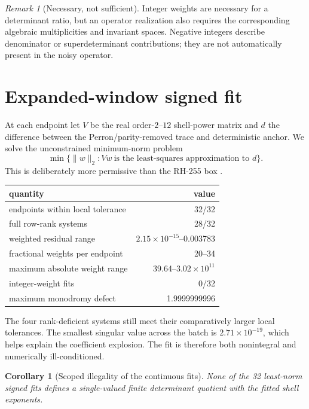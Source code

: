 \documentclass[11pt]{article}
\newtheorem{corollary}[theorem]{Corollary}
\theoremstyle{remark}
\newtheorem{remark}[theorem]{Remark}
\begin{document}
\begin{remark}[Necessary, not sufficient]
Integer weights are necessary for a determinant ratio, but an operator
realization also requires the corresponding algebraic multiplicities and
invariant spaces.  Negative integers describe denominator or superdeterminant
contributions; they are not automatically present in the noisy operator.
\end{remark}

\section{Expanded-window signed fit}

At each endpoint let $V$ be the real order-$2$--$12$ shell-power matrix and
$d$ the difference between the Perron/parity-removed trace and deterministic
anchor.  We solve the unconstrained minimum-norm problem
\begin{equation}
 \min\{\|w\|_2:Vw\ \text{is the least-squares approximation to }d\}.
 \label{eq:lstsq}
\end{equation}
This is deliberately more permissive than the RH-255 box
\citep{WangRH255}.

\begin{center}
\small
\begin{tabular}{lr}
\toprule
quantity & value\\
\midrule
endpoints within local tolerance & 32/32\\
full row-rank systems & 28/32\\
weighted residual range & $2.15\times10^{-15}$--0.003783\\
fractional weights per endpoint & 20--34\\
maximum absolute weight range & 39.64--$3.02\times10^{11}$\\
integer-weight fits & 0/32\\
maximum monodromy defect & 1.9999999996\\
\bottomrule
\end{tabular}
\end{center}

The four rank-deficient systems still meet their comparatively larger local
tolerances.  The smallest singular value across the batch is
$2.71\times10^{-19}$, which helps explain the coefficient explosion.  The
fit is therefore both nonintegral and numerically ill-conditioned.

\begin{corollary}[Scoped illegality of the continuous fits]
None of the 32 least-norm signed fits defines a single-valued finite
determinant quotient with the fitted shell exponents.
\end{corollary}
\end{document}
